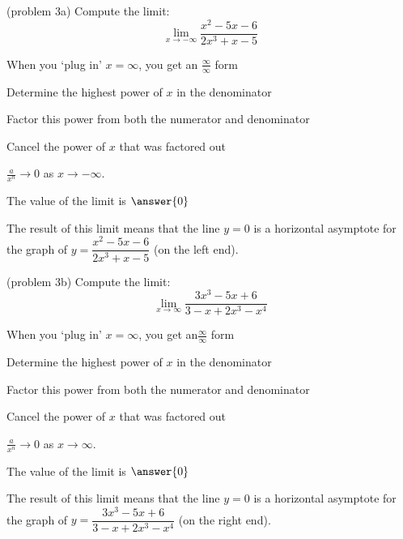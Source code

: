 \documentclass[handout]{ximera}
\begin{document}
\begin{problem}(problem 3a)
  Compute the limit:
  \[
  \lim_{x \to -\infty} \frac{x^2 - 5x - 6}{2x^3 + x -5}
  \]
  
    \begin{hint}
      When you `plug in' $x = \infty$, you get an $\frac{\infty}{\infty}$ form
    \end{hint}
    \begin{hint}
      Determine the highest power of $x$ in the denominator
    \end{hint}
    \begin{hint}
      Factor this power from both the numerator and denominator
    \end{hint}
    \begin{hint}
      Cancel the power of $x$ that was factored out
    \end{hint}
    \begin{hint}
      $\frac{a}{x^n} \to 0$ as $x \to -\infty$.
    \end{hint}
		The value of the limit is
		 $\answer{0}$
		
	
		
		The result of this limit means that the line $y = 0$  is a horizontal asymptote
for the graph of $y = \dfrac{x^2 - 5x - 6}{2x^3 + x -5}$ (on the left end).
\end{problem}


\begin{problem}(problem 3b)
  Compute the limit:
  \[
  \lim_{x \to \infty} \frac{3x^3 - 5x + 6}{3-x+ 2x^3- x^4}
  \]
  
    \begin{hint}
      When you `plug in' $x = \infty$, you get an$\frac{\infty}{\infty}$ form
    \end{hint}
    \begin{hint}
      Determine the highest power of $x$ in the denominator
    \end{hint}
    \begin{hint}
      Factor this power from both the numerator and denominator
    \end{hint}
    \begin{hint}
      Cancel the power of $x$ that was factored out
    \end{hint}
    \begin{hint}
      $\frac{a}{x^n} \to 0$ as $x \to \infty$.
    \end{hint}
		The value of the limit is
		 $\answer{0}$
	
		The result of this limit means that the line $y = 0$  is a horizontal asymptote
for the graph of $y = \dfrac{3x^3 - 5x + 6}{3-x+ 2x^3- x^4}$ (on the right end).
\end{problem}
\end{document}
